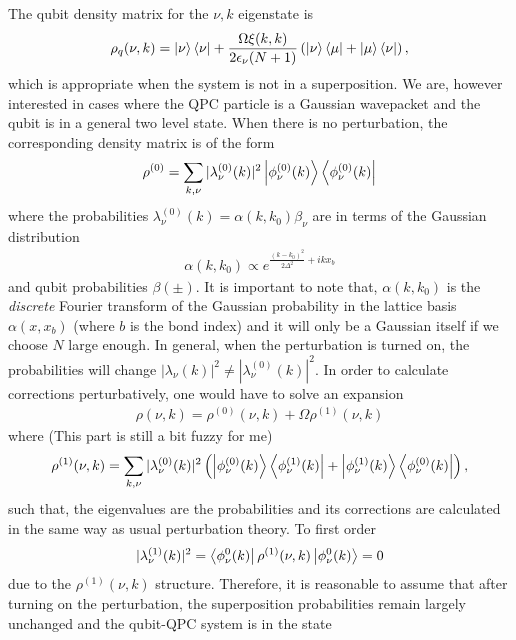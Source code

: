 \documentclass{article}
\newcommand\sj[1]{ {\color{orange} #1} }
\begin{document}
The qubit density matrix for the $\nu, k$ eigenstate is
\begin{align}
    \rho_{q}(\nu,k) = \ket{\nu}\bra{\nu} + \frac{\Omega \xi (k,k)}{2\epsilon_\nu (N+1)}\left( \ket{\nu} \bra{\mu} + \ket{\mu} \bra{\nu}  \right),
\end{align}
which is appropriate when the system is not in a superposition. We are, however interested in cases where the QPC particle is a Gaussian wavepacket and the qubit is in a general two level state. When there is no perturbation, the corresponding density matrix is of the form
\begin{align}
    \rho^{(0)} = \sum_{k,\nu} | \lambda^{(0)}_{\nu}(k)|^2  \ket{\phi_\nu^{(0)}(k)}\bra{\phi_\nu^{(0)}(k)}
\end{align}
where the probabilities $ \lambda^{(0)}_{\nu}(k) = \alpha (k, k_0) \beta_{\nu}$ are in terms of the Gaussian distribution
\begin{align}
    \alpha(k,k_0) \propto e^{\frac{(k-k_0)^2}{2\Delta^2} + i k x_b}
\end{align}
and qubit probabilities $\beta(\pm)$. It is important to note that, $\alpha(k,k_0)$ is the \textit{discrete} Fourier transform of the Gaussian probability in the lattice basis $\alpha (x,x_b)$ (where $b$ is the bond index) and it will only be a Gaussian itself if we choose $N$ large enough. In general, when the perturbation is turned on, the probabilities will change $| \lambda_{\nu}(k)|^2  \neq | \lambda^{(0)}_{\nu}(k)|^2$. In order to calculate corrections perturbatively, one would have to solve an expansion 
\begin{align}
    \rho(\nu,k) = \rho^{(0)}(\nu,k) + \Omega \rho^{(1)}(\nu,k)
\end{align} 
where \sj{(This part is still a bit fuzzy for me)}
\begin{align}
    \rho^{(1)}(\nu,k) = \sum_{k,\nu} | \lambda^{(0)}_{\nu}(k)|^2  \left(\ket{\phi_\nu^{(0)}(k)}\bra{\phi_\nu^{(1)}(k)} + \ket{\phi_\nu^{(1)}(k)}\bra{\phi_\nu^{(0)}(k)}\right),
\end{align}
such that, the eigenvalues are the probabilities and its corrections are calculated in the same way as usual perturbation theory. To first order 
\begin{align}
    | \lambda^{(1)}_{\nu}(k)|^2 = \bra{\phi_\nu^{0}(k)} \rho^{(1)}(\nu,k)\ket{\phi_\nu^{0}(k)} = 0
\end{align}
due to the $\rho^{(1)}(\nu,k)$ structure. Therefore, it is reasonable to assume that after turning on the perturbation, the superposition probabilities remain largely unchanged and the qubit-QPC system is in the state
\end{document}
